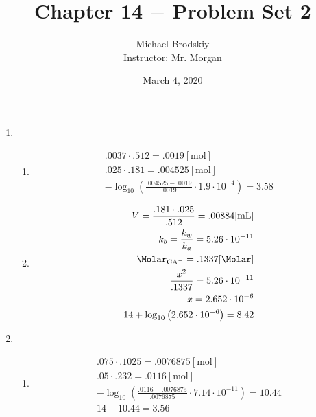 \documentclass[12pt]{article}
\title{Chapter 14 $-$ Problem Set 2}
\date{March 4, 2020}
\author{Michael Brodskiy\\ \small Instructor: Mr. Morgan}
\begin{document}
\maketitle

\begin{enumerate}

  \item

    \begin{enumerate}

      \item 

        \begin{equation}
          \begin{split}
            .0037\cdot.512=.0019[\si{\mole}]\\
            .025\cdot.181=.004525[\si{\mole}]\\
            -\log_{10}\left( \frac{.004525-.0019}{.0019}\cdot1.9\cdot10^{-4} \right)=3.58
          \end{split}
          \label{1}
        \end{equation}

      \item {}

        \begin{equation}
          \begin{split}
            V=\frac{.181\cdot.025}{.512}=.00884[\si{\milli\liter}]\\
            k_b=\frac{k_w}{k_a}=5.26\cdot10^{-11}\\
            \si{\Molar}_{\ce{CA-}}=.1337[\si{\Molar}]\\
            \frac{x^2}{.1337}=5.26\cdot10^{-11}\\
            x=2.652\cdot10^{-6}\\
            14+\log_{10}\left( 2.652\cdot10^{-6} \right)=8.42
          \end{split}
          \label{2}
        \end{equation}

    \end{enumerate}

  \item

    \begin{enumerate}

      \item 

        \begin{equation}
          \begin{split}
            .075\cdot.1025=.0076875[\si{\mole}]\\
            .05\cdot.232=.0116[\si{\mole}]\\
            -\log_{10}\left( \frac{.0116-.0076875}{.0076875}\cdot7.14\cdot10^{-11} \right)=10.44\\
            14-10.44=3.56
          \end{split}
          \label{3}
        \end{equation}


\end{enumerate}
\end{enumerate}
\end{document}
